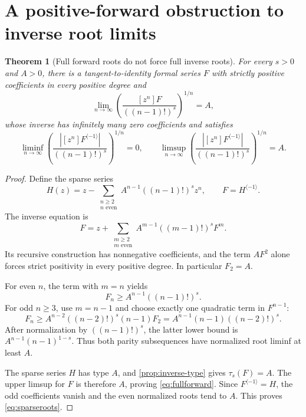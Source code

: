 \documentclass[11pt,a4paper]{article}
\newtheorem{theorem}{Theorem}[section]
\theoremstyle{definition}
\theoremstyle{remark}
\newcommand{\typ}{\tau_s}
\newcommand{\inv}{^{\langle-1\rangle}}
\numberwithin{equation}{section}
\begin{document}
\section{A positive-forward obstruction to inverse root limits}
\label{sec:counterexample}

\begin{theorem}[Full forward roots do not force full inverse roots]
\label{thm:rootcounter}
For every $s>0$ and $A>0$, there is a tangent-to-identity formal series
$F$ with strictly positive coefficients in every positive degree and
\begin{equation}
 \lim_{n\to\infty}
 \left(\frac{[z^n]F}{((n-1)!)^s}\right)^{1/n}=A,
 \label{eq:fullforward}
\end{equation}
whose inverse has infinitely many zero coefficients and satisfies
\begin{equation}
 \liminf_{n\to\infty}
 \left(\frac{|[z^n]F\inv|}{((n-1)!)^s}\right)^{1/n}=0,
 \qquad
 \limsup_{n\to\infty}
 \left(\frac{|[z^n]F\inv|}{((n-1)!)^s}\right)^{1/n}=A.
 \label{eq:sparseroots}
\end{equation}
\end{theorem}
\begin{proof}
Define the sparse series
\begin{equation}
 H(z)=z-\sum_{\substack{n\ge2\\n\text{ even}}}
                  A^{n-1}((n-1)!)^s z^n,
 \qquad F=H\inv.
 \label{eq:sparseH}
\end{equation}
The inverse equation is
\[
 F=z+\sum_{\substack{m\ge2\\m\text{ even}}}
          A^{m-1}((m-1)!)^s F^m.
\]
Its recursive construction has nonnegative coefficients, and the term
$AF^2$ alone forces strict positivity in every positive degree. In
particular $F_2=A$.

For even $n$, the term with $m=n$ yields
\[
 F_n\ge A^{n-1}((n-1)!)^s.
\]
For odd $n\ge3$, use $m=n-1$ and choose exactly one quadratic term in
$F^{n-1}$:
\[
 F_n\ge A^{n-2}((n-2)!)^s(n-1)F_2
       =A^{n-1}(n-1)((n-2)!)^s.
\]
After normalization by $((n-1)!)^s$, the latter lower bound is
$A^{n-1}(n-1)^{1-s}$. Thus both parity subsequences have normalized
root liminf at least $A$.

The sparse series $H$ has type $A$, and
\cref{prop:inverse-type} gives $\typ(F)=A$. The upper limsup for $F$
is therefore $A$, proving \eqref{eq:fullforward}. Since $F\inv=H$,
the odd coefficients vanish and the even normalized roots tend to $A$.
This proves \eqref{eq:sparseroots}.
\end{proof}
\end{document}
